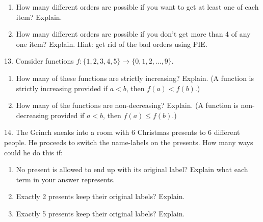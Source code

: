 \documentclass[10pt,]{book}
\theoremstyle{plain}
\theoremstyle{definition}
\theoremstyle{definition}
\theoremstyle{definition}
\numberwithin{equation}{chapter}
\newcommand{\lt}{ < }
\begin{document}
\begin{exerciselist}
\begin{enumerate}[label=(\alph*)]
\item\hypertarget{li-803}{}
                How many different orders are possible if you want to get at least one of each item? Explain.


\item\hypertarget{li-804}{}
                How many different orders are possible if you don't get more than 4 of any one item? Explain. Hint: get rid of the bad orders using PIE.


\end{enumerate}
\par\smallskip
\item[13.]\hypertarget{exercise-136}{}
            Consider functions \(f:\{1,2,3,4,5\} \to \{0,1,2,\ldots,9\}\).
\leavevmode%
\begin{enumerate}[label=(\alph*)]
\item\hypertarget{li-805}{}
                How many of these functions are strictly increasing? Explain. (A function is strictly increasing provided if \(a \lt  b\), then \(f(a) \lt  f(b)\).)


\item\hypertarget{li-806}{}
                How many of the functions are non-decreasing? Explain. (A function is non-decreasing provided if \(a \lt  b\), then \(f(a) \le f(b)\).)


\end{enumerate}
\par\smallskip
\item[14.]\hypertarget{exercise-137}{}
            The Grinch sneaks into a room with 6 Christmas presents to 6 different people. He proceeds to switch the name-labels on the presents. How many ways could he do this if:
\leavevmode%
\begin{enumerate}[label=(\alph*)]
\item\hypertarget{li-807}{}
                No present is allowed to end up with its original label? Explain what each term in your answer represents.


\item\hypertarget{li-808}{}
                Exactly 2 presents keep their original labels? Explain.


\item\hypertarget{li-809}{}
                Exactly 5 presents keep their original labels? Explain.


\end{enumerate}
\par\smallskip
\end{exerciselist}
\typeout{************************************************}
\typeout{************************************************}
\end{document}
